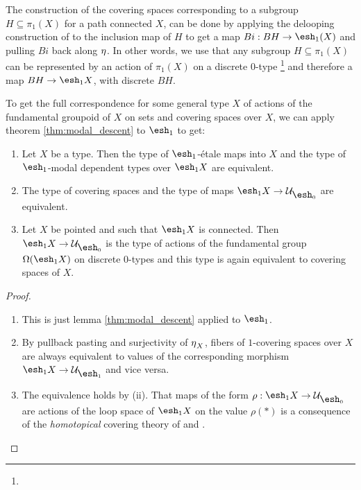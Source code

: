 \documentclass[9pt,twosided]{amsart}
\newcommand{\shape}{\ensuremath{\mathord{\raisebox{0.5pt}{\text{\rm\esh}}}}}
\begin{document}
The construction of the covering spaces corresponding to a subgroup $H\subseteq \pi_1(X)$ for a path connected $X$,
can be done by applying the delooping construction of \cite{LicataFinster} to the inclusion map of $H$ to get a map $Bi:BH\to\shape_1(X)$ and pulling $Bi$ back along ${\eta_{}}$. In other words, we use that any subgroup $H\subseteq\pi_1(X)$ can be represented by an action of $\pi_1(X)$ on a discrete $0$-type
\footnote{}
and therefore a map $BH\to \shape_1X$, with discrete $BH$.

To get the full correspondence for some general type $X$ of actions of the fundamental groupoid of $X$ on sets and covering spaces over $X$,
we can apply theorem \ref{thm:modal_descent} to $\shape_1$ to get:

\begin{thm}
  \begin{enumerate}
  \item Let $X$ be a type. Then the type of $\shape_1$-étale maps into $X$ and the type of $\shape_1$-modal dependent types over $\shape_1 X$ are equivalent.
  \item The type of covering spaces and the type of maps $\shape_1X\to \mathcal U_{\shape_0}$ are equivalent.
  \item Let $X$ be pointed and such that $\shape_1 X$ is connected. Then $\shape_1X\to \mathcal U_{\shape_0}$ is the type of actions of the fundamental group $\Omega(\shape_1 X)$ on discrete $0$-types and this type is again equivalent to covering spaces of $X$.
  \end{enumerate}
\end{thm}
\begin{proof}
  \begin{enumerate}
  \item This is just lemma \ref{thm:modal_descent} applied to $\shape_1$.
  \item By pullback pasting and surjectivity of ${\eta_{}}_X$, fibers of $1$-covering spaces over $X$ are always equivalent to values of the corresponding morphism $\shape_1 X\to \mathcal U_{\shape_1}$ and vice versa.
  \item The equivalence holds by (ii).
    That maps of the form $\rho:\shape_1 X\to \mathcal U_{\shape_0}$ are actions of the loop space of $\shape_1 X$ on the value $\rho(\ast)$ is a consequence of the \emph{homotopical} covering theory of \cite[Section 3.1]{favonia-thesis} and \cite[Section 7.1]{ulrik-egbert-floris-groups}.
  \end{enumerate}
\end{proof}
\end{document}
